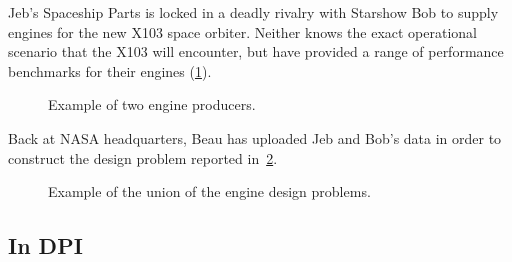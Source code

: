 \begin{example}
    Jeb's Spaceship Parts is locked in a deadly rivalry with Starshow Bob to supply engines for the new X103 space orbiter. Neither knows the exact operational scenario that the X103 will encounter, but have provided a range of performance benchmarks for their engines (\cref{fig:exunion_1}).
    \begin{figure}[h!]
        \begin{center}
        \end{center}
        \caption{Example of two engine producers. }
        \label{fig:exunion_1}
    \end{figure}
    Back at NASA headquarters, Beau has uploaded Jeb and Bob's data in order to construct the design problem reported in~\cref{fig:exunion_2}.
    \begin{figure}[h!]
        \begin{center}
        \end{center}
        \caption{Example of the union of the engine design problems. }
        \label{fig:exunion_2}
    \end{figure}
\end{example}

\subsection{In DPI}\label{subsec:dpi-union}


